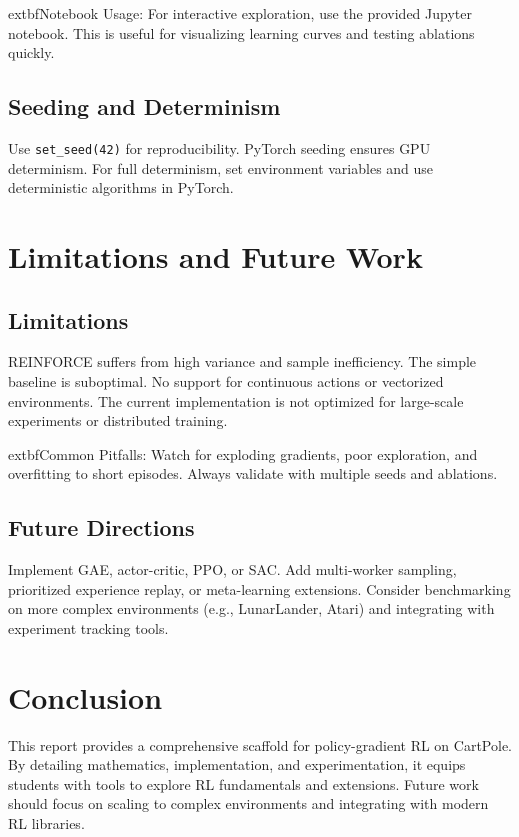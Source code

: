 \documentclass[conference]{IEEEtran}
\begin{document}
	extbf{Notebook Usage:} For interactive exploration, use the provided Jupyter notebook. This is useful for visualizing learning curves and testing ablations quickly.

\subsection{Seeding and Determinism}


Use \texttt{set\_seed(42)} for reproducibility. PyTorch seeding ensures GPU determinism. For full determinism, set environment variables and use deterministic algorithms in PyTorch.


\section{Limitations and Future Work}
\label{sec:limitations}

\subsection{Limitations}

REINFORCE suffers from high variance and sample inefficiency. The simple baseline is suboptimal. No support for continuous actions or vectorized environments. The current implementation is not optimized for large-scale experiments or distributed training.

	extbf{Common Pitfalls:} Watch for exploding gradients, poor exploration, and overfitting to short episodes. Always validate with multiple seeds and ablations.

\subsection{Future Directions}


Implement GAE, actor-critic, PPO, or SAC. Add multi-worker sampling, prioritized experience replay, or meta-learning extensions. Consider benchmarking on more complex environments (e.g., LunarLander, Atari) and integrating with experiment tracking tools.


\section{Conclusion}
\label{sec:conclusion}

This report provides a comprehensive scaffold for policy-gradient RL on CartPole. By detailing mathematics, implementation, and experimentation, it equips students with tools to explore RL fundamentals and extensions. Future work should focus on scaling to complex environments and integrating with modern RL libraries.
\end{document}
